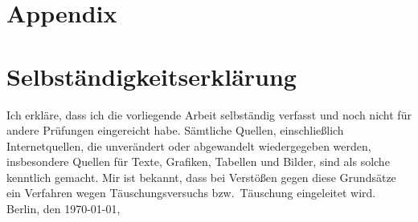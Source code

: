 \documentclass[draft=false,twoside,12pt]{scrreprt}
\begin{document}
\appendix
\chapter{Appendix}



\printbibliography

\chapter*{Selbständigkeitserklärung}
Ich erkläre, dass ich die vorliegende Arbeit selbständig verfasst und noch nicht 
für andere Prüfungen eingereicht habe. Sämtliche Quellen, einschließlich
Internetquellen, die unverändert oder abgewandelt wiedergegeben werden,
insbesondere Quellen für Texte, Grafiken, Tabellen und Bilder, sind als solche
kenntlich gemacht. Mir ist bekannt, dass bei Verstößen gegen diese Grundsätze ein
Verfahren wegen Täuschungsversuchs bzw.\ Täuschung eingeleitet wird. 
\bigbreak
\noindent Berlin, den \today, 
\end{document}
